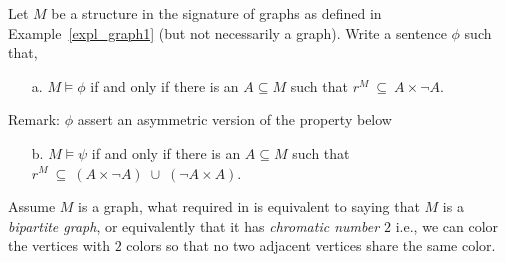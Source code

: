 \begin{exercise}\label{ex_grafo_bipartito}
Let $M$ be a structure in the signature of graphs as defined in Example~\ref{expl_graph1} (but not necessarily a graph). Write a sentence $\phi$ such that, 
\begin{itemize} 
\item[a.] $M\models\phi$ if and only if there is an $A\subseteq M$ such that $r^M\ \subseteq\ A\times\neg A$.
\end{itemize}
Remark: $\phi$ assert an asymmetric version of the property below
\begin{itemize} 
\item[b.] $M\models\psi$ if and only if there is an $A\subseteq M$ such that $r^M\ \subseteq\ (A\times \neg A)\;\cup\;(\neg A\times A)$.
\end{itemize}
Assume $M$ is a graph, what required in  is equivalent to saying that $M$ is a \textit{bipartite graph}, or equivalently that it has \textit{chromatic number $2$\/} i.e., we can color the vertices with $2$ colors so that no two adjacent vertices share the same color.\QED
\end{exercise}


